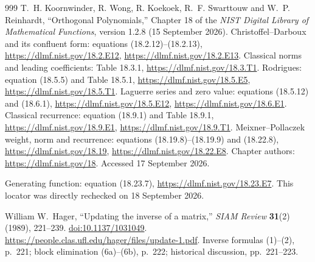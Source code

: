 \documentclass[11pt,a4paper]{article}
\begin{document}
\begin{thebibliography}{999}
T.~H. Koornwinder, R. Wong, R. Koekoek, R.~F. Swarttouw and
W.~P. Reinhardt,
``Orthogonal Polynomials,'' Chapter 18 of the
\emph{NIST Digital Library of Mathematical Functions},
version 1.2.8 (15 September 2026).
Christoffel--Darboux and its confluent form: equations (18.2.12)--(18.2.13),
\url{https://dlmf.nist.gov/18.2.E12},
\url{https://dlmf.nist.gov/18.2.E13}.
Classical norms and leading coefficients: Table 18.3.1,
\url{https://dlmf.nist.gov/18.3.T1}.
Rodrigues: equation (18.5.5) and Table 18.5.1,
\url{https://dlmf.nist.gov/18.5.E5},
\url{https://dlmf.nist.gov/18.5.T1}.
Laguerre series and zero value: equations (18.5.12) and (18.6.1),
\url{https://dlmf.nist.gov/18.5.E12},
\url{https://dlmf.nist.gov/18.6.E1}.
Classical recurrence: equation (18.9.1) and Table 18.9.1,
\url{https://dlmf.nist.gov/18.9.E1},
\url{https://dlmf.nist.gov/18.9.T1}.
Meixner--Pollaczek weight, norm and recurrence:
equations (18.19.8)--(18.19.9) and (18.22.8),
\url{https://dlmf.nist.gov/18.19},
\url{https://dlmf.nist.gov/18.22.E8}.
Chapter authors: \url{https://dlmf.nist.gov/18}.
Accessed 17 September 2026.


Generating function: equation (18.23.7),
\url{https://dlmf.nist.gov/18.23.E7}.
This locator was directly rechecked on 18 September 2026.


William W.~Hager, ``Updating the inverse of a matrix,''
\emph{SIAM Review} \textbf{31}(2) (1989), 221--239.
\href{https://doi.org/10.1137/1031049}{doi:10.1137/1031049}.
\url{https://people.clas.ufl.edu/hager/files/update-1.pdf}.
Inverse formulas (1)--(2), p.~221; block elimination (6a)--(6b),
p.~222; historical discussion, pp.~221--223.


\end{thebibliography}
\end{document}

